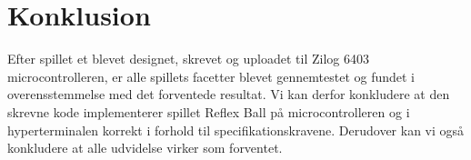 \newpage
\chapter{Konklusion}
Efter spillet et blevet designet, skrevet og uploadet til Zilog 6403 microcontrolleren, er alle spillets facetter blevet gennemtestet og fundet i overensstemmelse med det forventede resultat. Vi kan derfor konkludere at den skrevne kode implementerer spillet Reflex Ball på microcontrolleren og i hyperterminalen korrekt i forhold til specifikationskravene. Derudover kan vi også konkludere at alle udvidelse virker som forventet. \\

